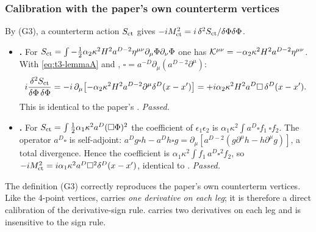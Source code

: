 \subsubsection{Calibration with the paper's own counterterm vertices \texorpdfstring{\tC}{}}\label{sec:t3-calib}
By (G3), a counterterm action \(S_{\rm ct}\) gives
\(-iM^2_{\rm ct}=i\,\delta^2S_{\rm ct}/\delta\Phi\delta\Phi\).
\begin{itemize}
\item \textbf{.} For \(S_{\rm ct}=\int-\tfrac12\alpha_2\kappa^2H^2a^{D-2}\eta^{\mu\nu}\partial_\mu\Phi\partial_\nu\Phi\)
one has \(\mathcal K^{\mu\nu}=-\alpha_2\kappa^2H^2a^{D-2}\eta^{\mu\nu}\). With
\eqref{eq:t3-lemmaA} and , \(\square=a^{-D}\partial_\mu(a^{D-2}\partial^\mu)\):
\begin{equation}\label{eq:t3-calib131}
i\frac{\delta^2S_{\rm ct}}{\delta\Phi\,\delta\Phi}
=-i\,\partial_\mu\bigl[-\alpha_2\kappa^2H^2a^{D-2}\partial^\mu\delta^D(x-x')\bigr]
=+i\alpha_2\kappa^2H^2a^D\square\,\delta^D(x-x') .
\end{equation}
This is identical to the paper's . \emph{Passed.}
\item \textbf{.} For \(S_{\rm ct}=\int\tfrac12\alpha_1\kappa^2a^D(\square\Phi)^2\) the
coefficient of \(\epsilon_1\epsilon_2\) is \(\alpha_1\kappa^2\int a^D\square f_1\,\square f_2\).
The operator \(a^D\square\) is self-adjoint:
\(a^Dg\square h-a^Dh\square g=\partial_\mu[a^{D-2}(g\partial^\mu h-h\partial^\mu g)]\), a total
divergence. Hence the coefficient is \(\alpha_1\kappa^2\int f_1\,a^D\square^2f_2\), so
\(-iM^2_{\rm ct}=i\alpha_1\kappa^2a^D\square^2\delta^D(x-x')\), identical to .
\emph{Passed.}
\end{itemize}
The definition (G3) correctly reproduces the paper's own counterterm vertices. Like the
4-point vertices,  carries \emph{one derivative on each leg}; it is therefore a
direct calibration of the derivative-sign rule.  carries two derivatives on each
leg and is insensitive to the sign rule.

